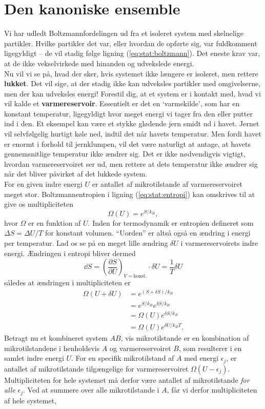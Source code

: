 \section{Den kanoniske ensemble}
Vi har udledt Boltzmannfordelingen ud fra et isoleret system med skelnelige partikler. Hvilke partikler det var, eller hvordan de opførte sig, var fuldkomment ligegyldigt -- de vil stadig følge ligning (\ref{eq:stat:boltzmann}). Det eneste krav var, at de ikke vekselvirkede med hinanden og udvekslede energi.\\
Nu vil vi se på, hvad der sker, hvis systemet ikke længere er isoleret, men rettere \textbf{lukket}. Det vil sige, at der stadig ikke kan udveksles partikler med omgivelserne, men der kan udveksles energi! Forestil dig, at et system er i kontakt med, hvad vi vil kalde et \textbf{varmereservoir}. Essentielt er det en `varmekilde', som har en konstant temperatur, ligegyldigt hvor meget energi vi tager fra den eller putter ind i den. Et eksempel kan være et stykke glødende jern smidt ud i havet. Jernet vil selvfølgelig hurtigt køle ned, indtil det når havets temperatur. Men fordi havet er enormt i forhold til jernklumpen, vil det være naturligt at antage, at havets gennemsnitlige temperatur ikke ændrer sig. Det er ikke nødvendigvis vigtigt, hvordan varmereservoiret ser ud, men rettere at dets temperatur ikke ændrer sig når det bliver påvirket af det lukkede system.\\
\indent For en given indre energi $U$ er antallet af mikrotilstande af varmereservoiret meget stor. Boltzmannentropien i ligning (\ref{eq:stat:entropi}) kan omskrives til at give os multipliciteten
\[ \Omega(U)=e^{S/k_B}, \]
hvor $\Omega$ er en funktion af $U$. Inden for termodynamik er entropien defineret som $\Delta S=\Delta U/T$ for konstant volumen. ``Uorden'' er altså også en ændring i energi per temperatur. Lad os se på en meget lille ændring $\delta U$ i varmereservoirets indre energi. Ændringen i entropi bliver dermed
\[ \dd S=\left(\frac{\partial S}{\partial U}\right)_{V=\text{konst.}}\cdot\delta U=\frac{1}{T}\delta U \]
således at ændringen i multipliciteten er
\begin{align*} 
    \Omega(U+\delta U)&=e^{(S+\delta S)/k_B}\\
    &=e^{S/k_B}e^{\delta S/k_B}\\
    &=\Omega(U)e^{\delta S/k_B}\\
    &=\Omega(U)e^{\delta U/k_BT}.
\end{align*}
Betragt nu et kombineret system $AB$, vis mikrotilstande er en kombination af mikrotilstandene i henholdsvis $A$ og varmereservoiret $B$, som resulterer i en samlet indre energi $U$. For en specifik mikrotilstand af $A$ med energi $\epsilon_j$, er antallet af mikrotilstande tilgængelige for varmereservoiret $\Omega(U-\epsilon_j)$. Multipliciteten for hele systemet må derfor være antallet af mikrotilstande \emph{for alle} $\epsilon_j$. Ved at summere over alle mikrotilstande i $A$, får vi derfor multipliciteten af hele systemet,
